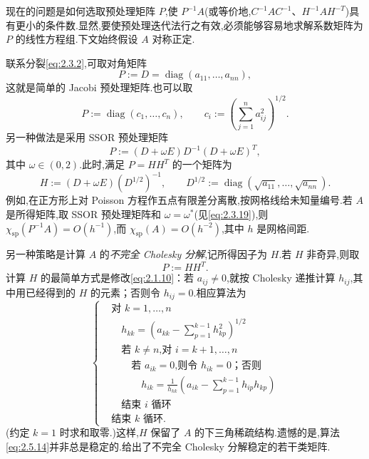 现在的问题是如何选取预处理矩阵 \(P\),使 \(P^{-1}A\)(或等价地,\(C^{-1}AC^{-1}\)、\(H^{-1}AH^{-T}\))具有更小的条件数.显然,要使预处理迭代法行之有效,必须能够容易地求解系数矩阵为 \(P\) 的线性方程组.下文始终假设 \(A\) 对称正定.

联系分裂\eqref{eq:2.3.2},可取对角矩阵
\begin{equation}\label{eq:2.5.9}
  P:=D=\operatorname{diag}(a_{11},\ldots,a_{nn}),
\end{equation}
这就是简单的 Jacobi 预处理矩阵.也可以取
\begin{equation}\label{eq:2.5.10}
  P:=\operatorname{diag}(c_1,\ldots,c_n),\qquad
  c_i:=\left(\sum_{j=1}^n a_{ij}^2\right)^{1/2}.
\end{equation}
另一种做法是采用 SSOR 预处理矩阵
\begin{equation}\label{eq:2.5.11}
  P:=(D+\omega E)D^{-1}(D+\omega E)^T,
\end{equation}
其中 \(\omega\in(0,2)\).此时,满足 \(P=HH^T\) 的一个矩阵为
\begin{equation}\label{eq:2.5.12}
  H:=(D+\omega E)(D^{1/2})^{-1},\qquad
  D^{1/2}:=\operatorname{diag}(\sqrt{a_{11}},\ldots,\sqrt{a_{nn}}).
\end{equation}
例如,在正方形上对 Poisson 方程作五点有限差分离散,按网格线给未知量编号.若 \(A\) 是所得矩阵,取 SSOR 预处理矩阵和 \(\omega=\omega^*\)(见\eqref{eq:2.3.19}),则 \(\chi_{\mathrm{sp}}(P^{-1}A)=O(h^{-1})\),而 \(\chi_{\mathrm{sp}}(A)=O(h^{-2})\),其中 \(h\) 是网格间距.

另一种策略是计算 \(A\) 的\emph{不完全 Cholesky 分解},记所得因子为 \(H\).若 \(H\) 非奇异,则取
\begin{equation}\label{eq:2.5.13}
  P:=HH^T.
\end{equation}
计算 \(H\) 的最简单方式是修改\eqref{eq:2.1.10}：若 \(a_{ij}\ne0\),就按 Cholesky 递推计算 \(h_{ij}\),其中用已经得到的 \(H\) 的元素；否则令 \(h_{ij}=0\).相应算法为
\begin{equation}\label{eq:2.5.14}
  \left\{
  \begin{aligned}
    &\text{对 }k=1,\ldots,n\\
    &\quad h_{kk}=\left(a_{kk}-\sum_{p=1}^{k-1}h_{kp}^2\right)^{1/2}\\
    &\quad\text{若 \(k\ne n\),对 }i=k+1,\ldots,n\\
    &\qquad\text{若 \(a_{ik}=0\),则令 \(h_{ik}=0\)；否则}\\
    &\qquad\quad h_{ik}=\frac1{h_{kk}}\left(a_{ik}-\sum_{p=1}^{k-1}h_{ip}h_{kp}\right)\\
    &\quad\text{结束 \(i\) 循环}\\
    &\text{结束 \(k\) 循环.}
  \end{aligned}
  \right.
\end{equation}
(约定 \(k=1\) 时求和取零.)这样,\(H\) 保留了 \(A\) 的下三角稀疏结构.遗憾的是,算法\eqref{eq:2.5.14}并非总是稳定的.给出了不完全 Cholesky 分解稳定的若干类矩阵.

